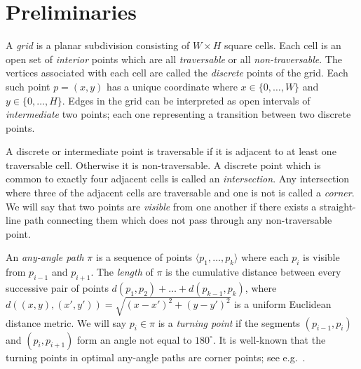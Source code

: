\section{Preliminaries}
A \emph{grid} is a planar subdivision consisting of $W \times H$ square cells.
Each cell is an open set of \emph{interior} points which are 
all \emph{traversable} or all \emph{non-traversable}.
The vertices associated with each cell are called the
\emph{discrete} points of the grid. Each such point $p = (x, y)$ has a unique coordinate
where $x \in \{0,\dots,W\}$ and $y \in \{0,\dots,H\}$.
Edges in the grid can be interpreted as open intervals of \emph{intermediate}
two points; each one representing a transition between two discrete points. 
\par
A discrete or intermediate point is traversable if it is adjacent to 
at least one traversable cell. Otherwise it is non-traversable.
A discrete point which is common to exactly four adjacent cells is called an \emph{intersection}.
Any intersection where three of the adjacent cells are traversable and one is not
is called a \emph{corner}.
We will say that two points are \emph{visible} from one another if there exists a 
straight-line path connecting them which does not pass through any non-traversable point.

An \emph{any-angle path} $\pi$ is a sequence of points 
$\langle p_1,\dots,p_k \rangle$ where each $p_{i}$ is visible from $p_{i-1}$
and $p_{i+1}$.
The \emph{length} of $\pi$ 
is the cumulative distance between every successive
pair of points $d(p_1,p_2) + \dots + d(p_{k-1},p_k)$, 
where $d((x,y), (x',y'))= \sqrt{(x-x')^2 + (y-y')^2}$ 
is a uniform Euclidean distance metric.
We will say $p_i \in \pi$ is a \emph{turning point} if the segments
$(p_{i-1}, p_i)$ and $(p_i, p_{i+1})$ form an angle not equal to $180^{\circ}$.
It is well-known that the turning points in optimal any-angle paths 
are corner points; see e.g.~\cite{mitchell87}.

